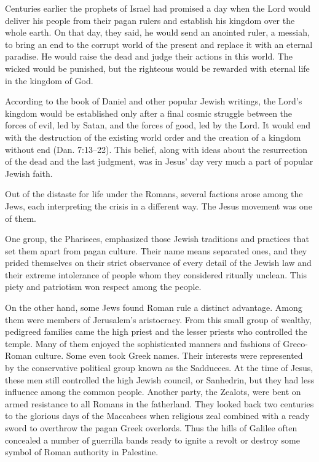 Centuries earlier the prophets of Israel had promised a day when the Lord would deliver his people
from their pagan rulers and establish his kingdom over the whole earth. On that day, they said, he
would send an anointed ruler, a messiah, to bring an end to the corrupt world of the present and
replace it with an eternal paradise. He would raise the dead and judge their actions in this world.
The wicked would be punished, but the righteous would be rewarded with eternal life in the kingdom
of God.

According to the book of Daniel and other popular Jewish writings, the Lord’s kingdom would be
established only after a final cosmic struggle between the forces of evil, led by Satan, and the
forces of good, led by the Lord. It would end with the destruction of the existing world order and
the creation of a kingdom without end (Dan. 7:13–22). This belief, along with ideas about the
resurrection of the dead and the last judgment, was in Jesus’ day very much a part of popular Jewish
faith.

Out of the distaste for life under the Romans, several factions arose among the Jews, each
interpreting the crisis in a different way. The Jesus movement was one of them.

One group, the Pharisees, emphasized those Jewish traditions and practices that set them apart from
pagan culture. Their name means separated ones, and they prided themselves on their strict
observance of every detail of the Jewish law and their extreme intolerance of people whom they
considered ritually unclean. This piety and patriotism won respect among the people.

On the other hand, some Jews found Roman rule a distinct advantage. Among them were members of
Jerusalem’s aristocracy. From this small group of wealthy, pedigreed families came the high priest
and the lesser priests who controlled the temple. Many of them enjoyed the sophisticated manners and
fashions of Greco-Roman culture. Some even took Greek names. Their interests were represented by the
conservative political group known as the Sadducees. At the time of Jesus, these men still
controlled the high Jewish council, or Sanhedrin, but they had less influence among the common
people. Another party, the Zealots, were bent on armed resistance to all Romans in the fatherland.
They looked back two centuries to the glorious days of the Maccabees when religious zeal combined
with a ready sword to overthrow the pagan Greek overlords. Thus the hills of Galilee often concealed
a number of guerrilla bands ready to ignite a revolt or destroy some symbol of Roman authority in
Palestine.

